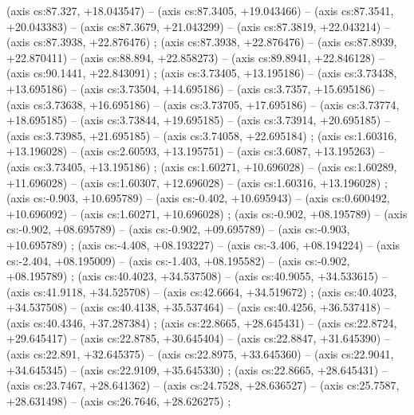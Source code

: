     (axis cs:87.327,    +18.043547) --  (axis cs:87.3405,    +19.043466) --  (axis cs:87.3541,    +20.043383) --  (axis cs:87.3679,    +21.043299) --  (axis cs:87.3819,    +22.043214) --  (axis cs:87.3938,    +22.876476) ;
    (axis cs:87.3938,    +22.876476) --  (axis cs:87.8939,    +22.870411) --  (axis cs:88.894,    +22.858273) --  (axis cs:89.8941,    +22.846128) --  (axis cs:90.1441,    +22.843091) ;
    (axis cs:3.73405,    +13.195186) --  (axis cs:3.73438,    +13.695186) --  (axis cs:3.73504,    +14.695186) --  (axis cs:3.7357,    +15.695186) --  (axis cs:3.73638,    +16.695186) --  (axis cs:3.73705,    +17.695186) --  (axis cs:3.73774,    +18.695185) --  (axis cs:3.73844,    +19.695185) --  (axis cs:3.73914,    +20.695185) --  (axis cs:3.73985,    +21.695185) --  (axis cs:3.74058,    +22.695184) ;
    (axis cs:1.60316,    +13.196028) --  (axis cs:2.60593,    +13.195751) --  (axis cs:3.6087,    +13.195263) --  (axis cs:3.73405,    +13.195186) ;
    (axis cs:1.60271,    +10.696028) --  (axis cs:1.60289,    +11.696028) --  (axis cs:1.60307,    +12.696028) --  (axis cs:1.60316,    +13.196028) ;
    (axis cs:-0.903,    +10.695789) --  (axis cs:-0.402,    +10.695943) --  (axis cs:0.600492,    +10.696092) --  (axis cs:1.60271,    +10.696028) ;
    (axis cs:-0.902,    +08.195789) --  (axis cs:-0.902,    +08.695789) --  (axis cs:-0.902,    +09.695789) --  (axis cs:-0.903,    +10.695789) ;
    (axis cs:-4.408,    +08.193227) --  (axis cs:-3.406,    +08.194224) --  (axis cs:-2.404,    +08.195009) --  (axis cs:-1.403,    +08.195582) --  (axis cs:-0.902,    +08.195789) ;
    (axis cs:40.4023,    +34.537508) --  (axis cs:40.9055,    +34.533615) --  (axis cs:41.9118,    +34.525708) --  (axis cs:42.6664,    +34.519672) ;
    (axis cs:40.4023,    +34.537508) --  (axis cs:40.4138,    +35.537464) --  (axis cs:40.4256,    +36.537418) --  (axis cs:40.4346,    +37.287384) ;
    (axis cs:22.8665,    +28.645431) --  (axis cs:22.8724,    +29.645417) --  (axis cs:22.8785,    +30.645404) --  (axis cs:22.8847,    +31.645390) --  (axis cs:22.891,    +32.645375) --  (axis cs:22.8975,    +33.645360) --  (axis cs:22.9041,    +34.645345) --  (axis cs:22.9109,    +35.645330) ;
    (axis cs:22.8665,    +28.645431) --  (axis cs:23.7467,    +28.641362) --  (axis cs:24.7528,    +28.636527) --  (axis cs:25.7587,    +28.631498) --  (axis cs:26.7646,    +28.626275) ;
  